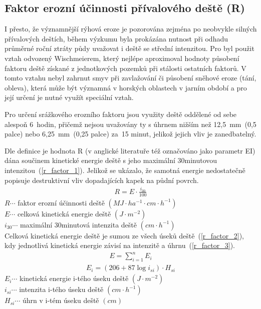 \subsection{Faktor erozní účinnosti přívalového deště (R)}
I přesto, že významnější rýhová eroze je pozorována zejména po neobvykle silných přívalových deštích, během výzkumu byla prokázána nutnost při odhadu průměrné roční ztráty půdy uvažovat i deště se střední intenzitou. Pro  byl použit vztah odvozený Wischmeierem\cite{Wischmeier1959}, který nejlépe aproximoval hodnoty působení faktoru deště získané z jednotkových pozemků při stálosti ostatních faktorů. V tomto vztahu nebyl zahrnut smyv při zavlažování či působení sněhové eroze (tání, obleva), která může být významná v horských oblastech v jarním období a pro její určení je nutné využít speciální vztah.

Pro určení srážkového erozního faktoru jsou využity deště oddělené od sebe alespoň 6~hodin, přičemž nejsou uvažovány ty s úhrnem nižším než 12,5~mm~(0,5 palce) nebo 6,25~mm~(0,25 palce) za~15 minut, jelikož jejich vliv je zanedbatelný.

Dle definice je hodnota R (v anglické literatuře též označováno jako parametr EI) dána součinem kinetické energie deště s jeho maximální 30minutovou intenzitou~(\ref{r_factor_1}). Jelikož se ukázalo, že samotná energie nedostatečně popisuje destruktivní vliv dopadajících kapek na půdní povrch.\cite{usle1978}
\begin{align}
   \label{r_factor_1} R=E\cdot  \frac{i_{30}}{100}
\end{align}
\hspace*{2cm}$R \cdots$ faktor erozní účinnosti deště  $\left( MJ\cdot ha^{-1}\cdot cm \cdot h^{-1} \right)$\\
\hspace*{2cm}$E \cdots$ celková kinetická energie deště $\left( J\cdot m^{-2} \right)$\\ 
\hspace*{2cm}$i_{30} \cdots$ maximální 30minutová intenzita deště $\left( cm\cdot h^{-1} \right)$\\ 

Celková kinetická energie deště je sumou ze všech úseků deště~(\ref{r_factor_2}), kdy jednotlivá kinetická energie závisí na intenzitě a úhrnu~(\ref{r_factor_3}).\cite{usle1978}
\begin{align}
   \label{r_factor_2} E=\sum_{i=1}^n E_{i}
\end{align}
\begin{align}
   \label{r_factor_3} E_{i}=\left( 206+87 \log i_{si} \right) \cdot H_{si}
\end{align}
\hspace*{2cm}$E_{i} \cdots$ kinetická energie i-tého úseku deště  $\left( J\cdot m^{-2} \right)$\\ 
\hspace*{2cm}$i_{si} \cdots$ intenzita i-tého úseku deště $\left( cm\cdot h^{-1} \right)$\\ 
\hspace*{2cm}$H_{si} \cdots$ úhrn v i-tém úseku deště $\left( cm \right)$\\ 

